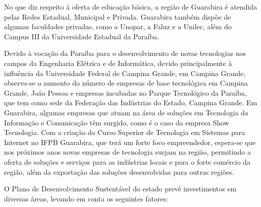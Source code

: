 
	No que diz respeito à oferta de educação básica, a região de Guarabira é atendida pelas Redes Estadual, Municipal e Privada. Guarabira tamb\'em disp\~oe de algumas faculdades privadas, como a Unopar, a Faluz e a Unilec, al\'em do Campus III da Universidade Estadual da Para\'iba.

	Devido \`a vocação da Para\'iba para o desenvolvimento de novas tecnologias nos campos da Engenharia Elétrica e de Informática, devido principalmente à influência da Universidade Federal de Campina Grande, em Campina Grande, observa-se o aumento do número de empresas de base tecnológica em Campina Grande, Jo\~ao Pessoa e empresas incubadas no Parque Tecnológico da Paraíba, que tem como sede da Federação das Indústrias do Estado, Campina Grande. Em Guarabira, algumas empresas que atuam na \'area de solu\c{c}\~oes em Tecnologia da Informa\c{c}\~ao e Comunica\c{c}\~ao t\^em surgido, como \'e o caso da empresa Show Tecnologia. Com a cria\c{c}\~ao do Curso Superior de Tecnologia em Sistemas para Internet no IFPB Guarabira, que ter\'a um forte foco empreendedor, espera-se que nos pr\'oximos anos novas empresas de tecnologia surjam na regi\~ao, permitindo a oferta de solu\c{c}\~oes e servi\c{c}os para as ind\'ustrias locais e para o forte com\'ercio da regi\~ao, al\'em da exporta\c{c}\~ao das solu\c{c}\~oes desenvolvidas para outras regi\~oes.
	
	
	O Plano de Desenvolvimento Sustentável do estado prevê investimentos em diversas áreas, levando em conta os seguintes fatores: 

